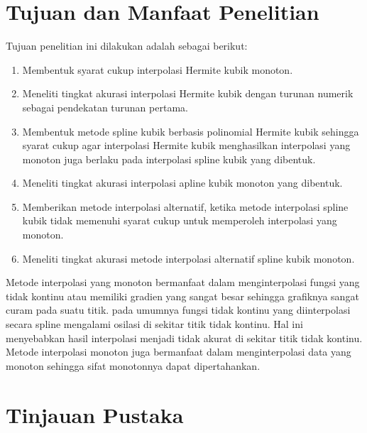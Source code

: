 \section{Tujuan dan Manfaat Penelitian}

Tujuan penelitian ini dilakukan adalah sebagai berikut:
\begin{enumerate}
    \item Membentuk syarat cukup interpolasi Hermite kubik monoton.
    \item Meneliti tingkat akurasi interpolasi Hermite kubik dengan turunan numerik sebagai pendekatan turunan pertama.
    \item Membentuk metode spline kubik berbasis polinomial Hermite kubik sehingga syarat cukup agar interpolasi Hermite kubik menghasilkan interpolasi yang monoton juga berlaku pada interpolasi spline kubik yang dibentuk.
    \item Meneliti tingkat akurasi interpolasi apline kubik monoton yang dibentuk.
    \item Memberikan metode interpolasi alternatif, ketika metode interpolasi spline kubik tidak memenuhi syarat cukup untuk memperoleh interpolasi yang monoton.
    \item Meneliti tingkat akurasi metode interpolasi alternatif spline kubik monoton.
\end{enumerate}

Metode interpolasi yang monoton bermanfaat dalam menginterpolasi fungsi yang tidak kontinu atau memiliki gradien yang sangat besar sehingga grafiknya sangat curam pada suatu titik. pada umumnya fungsi tidak kontinu yang diinterpolasi secara spline mengalami osilasi di sekitar titik tidak kontinu. Hal ini menyebabkan hasil interpolasi menjadi tidak akurat di sekitar titik tidak kontinu. Metode interpolasi monoton juga bermanfaat dalam menginterpolasi data yang monoton sehingga sifat monotonnya dapat dipertahankan.

\section{Tinjauan Pustaka}

